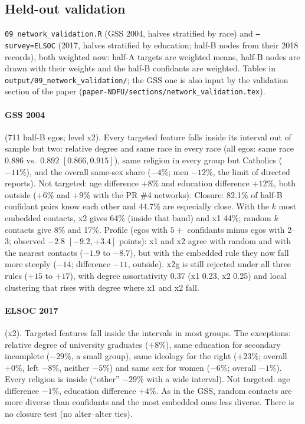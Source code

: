 \documentclass[11pt,a4paper]{article}
\newcommand{\code}[1]{\texttt{#1}}
\begin{document}
\subsection{Held-out validation}
\label{sec:pr5validation}

\code{09\_network\_validation.R} (GSS 2004, halves stratified by race) and \code{--survey=ELSOC}
(2017, halves stratified by education; half-B nodes from their 2018 records), both weighted now:
half-A targets are weighted means, half-B nodes are drawn with their weights and the half-B confidants
are weighted. Tables in \code{output/09\_network\_validation/}; the GSS one is also input by the
validation section of the paper (\code{paper-NDFU/sections/}\allowbreak\code{network\_validation.tex}).

\paragraph{GSS 2004} (711 half-B egos; level x2). Every targeted feature falls inside its interval out of
sample but two: relative degree and same race in every race (all egos: same race 0.886 vs.\ 0.892
$[0.866, 0.915]$), same religion in every group but Catholics ($-11\%$), and the overall same-sex share
($-4\%$; men $-12\%$, the limit of directed reports). Not targeted: age difference $+8\%$ and education
difference $+12\%$, both outside ($+6\%$ and $+9\%$ with the PR \#4 networks). Closure: 82.1\% of half-B
confidant pairs know each other and 44.7\% are especially close. With the $k$ most embedded contacts, x2
gives 64\% (inside that band) and x1 44\%; random $k$ contacts give 8\% and 17\%. Profile (egos with
$5+$ confidants minus egos with 2--3; observed $-2.8$ $[-9.2, +3.4]$ points): x1 and x2 agree with random
and with the nearest contacts ($-1.9$ to $-8.7$), but with the embedded rule they now fall more steeply
($-14$; difference $-11$, outside). x2g is still rejected under all three rules ($+15$ to $+17$), with
degree assortativity 0.37 (x1 0.23, x2 0.25) and local clustering that rises with degree where x1 and x2
fall.

\paragraph{ELSOC 2017} (x2). Targeted features fall inside the intervals in most groups. The exceptions:
relative degree of university graduates ($+8\%$), same education for secondary incomplete ($-29\%$, a
small group), same ideology for the right ($+23\%$; overall $+0\%$, left $-8\%$, neither $-5\%$) and same
sex for women ($-6\%$; overall $-1\%$). Every religion is inside (``other'' $-29\%$ with a wide interval).
Not targeted: age difference $-1\%$, education difference $+4\%$. As in the GSS, random contacts are more
diverse than confidants and the most embedded ones less diverse. There is no closure test (no
alter--alter ties).
\end{document}
